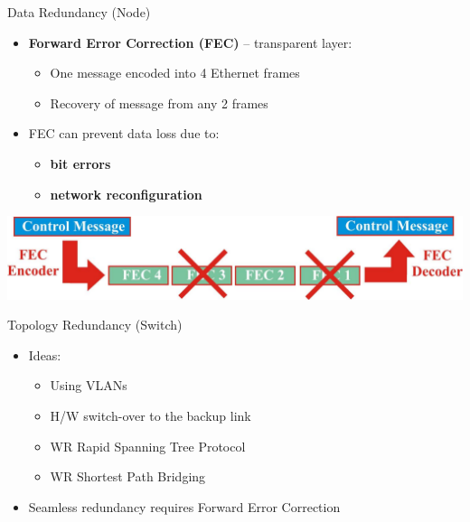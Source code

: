 \documentclass[compress,red]{beamer}
\begin{document}
\begin{frame}{Data Redundancy (Node)}
   
  \begin{itemize}
	\item {\bf Forward Error Correction (FEC)}  -- transparent layer:
	\begin{itemize}
		\item One message encoded into 4 Ethernet frames
		\item Recovery of message from any 2 frames
	\end{itemize}
	\item <2->FEC can prevent data loss due to:
	\begin{itemize}	
		\item<3-> {\bf bit errors} 
		\item<4> {\bf network reconfiguration}
	\end{itemize}	
  \end{itemize}
  
  	\begin{center}
      \includegraphics[width=.7\textwidth]{robustness/FEC.pdf}
    \end{center}
  
\end{frame}

\begin{frame}{Topology Redundancy (Switch)}

  \begin{itemize}
	\item Ideas:
	\begin{itemize}
        \item Using VLANs
        \item H/W switch-over to the backup link
	      \item WR Rapid Spanning Tree Protocol
	      \item WR Shortest Path Bridging
	\end{itemize}
	\item Seamless redundancy requires Forward Error Correction
  \end{itemize}
  
\end{frame}
\end{document}
